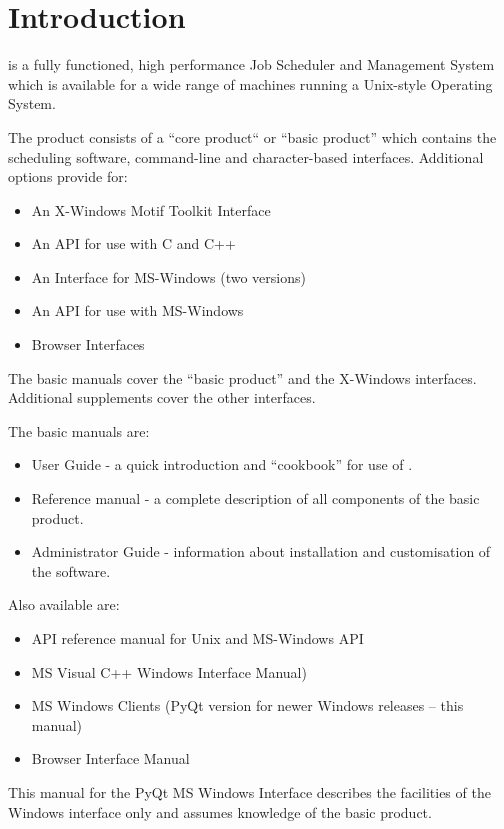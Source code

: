 \chapter{Introduction}
\label{chp:introduction}
\ProductName{} is a fully functioned, high performance Job Scheduler and
Management System which is available for a wide range of machines
running a Unix-style Operating System.

The product consists of a ``core product`` or ``basic product'' which contains the
scheduling software, command-line and character-based interfaces.
Additional options provide for:

\begin{itemize}
\item An X-Windows Motif Toolkit Interface
\item An API for use with C and C++
\item An Interface for MS-Windows (two versions)
\item An API for use with MS-Windows
\item Browser Interfaces
\end{itemize}
The basic manuals cover the ``basic product''
and the X-Windows interfaces. Additional supplements cover the other
interfaces.

The basic manuals are:

\begin{itemize}
\item User Guide - a quick introduction and ``cookbook'' for use of \ProductName{}.
\item Reference manual - a complete description of all components of the
basic product.
\item Administrator Guide - information about installation and
customisation of the software.
\end{itemize}
Also available are:

\begin{itemize}
\item API reference manual for Unix and MS-Windows API
\item MS Visual C++ Windows Interface Manual)
\item MS Windows Clients (PyQt version for newer Windows releases -- this manual)
\item Browser Interface Manual
\end{itemize}
This manual for the PyQt MS Windows Interface describes the
facilities of the Windows interface only and assumes knowledge of the
basic product.

